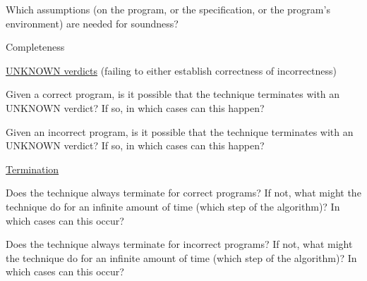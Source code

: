 \documentclass[a4paper]{article}
\begin{document}
\begin{minipage}[t]{0.16\linewidth}
\begin{betterlist}
\begin{betterlist}
\begin{betterlist}
			\end{betterlist}
			\item Which assumptions (on the program, or the specification, or the program’s environment) are needed for soundness?
		\end{betterlist}
		\item \alert{Completeness}
		\begin{betterlist}
			\item \underline{UNKNOWN verdicts} (failing to either establish correctness of incorrectness)
			\begin{betterlist}
				\item Given a correct program, is it possible that the technique terminates with an UNKNOWN verdict? If so, in which cases can this happen?

				\item Given an incorrect program, is it possible that the technique terminates with an UNKNOWN verdict? If so, in which cases can this happen?

			\end{betterlist}
			\item \underline{Termination}
			\begin{betterlist}
				\item Does the technique always terminate for correct programs? If not, what might the technique do for an infinite amount of time (which step of the algorithm)? In which cases can this occur?

				\framebox[0.90\textwidth][l]{\parbox{0.85\textwidth}{
						\begin{betterlist}
							\item TODO
						\end{betterlist}
					}}
				\item Does the technique always terminate for incorrect programs? If not, what might the technique do for an infinite amount of time (which step of the algorithm)? In which cases can this occur?


\end{betterlist}
\end{betterlist}
\end{betterlist}
\end{minipage}
\end{document}
